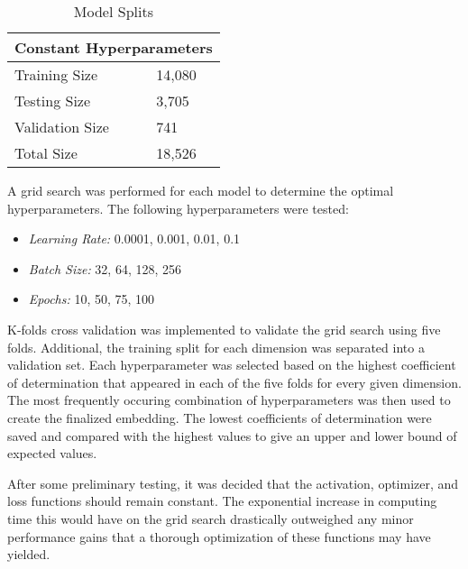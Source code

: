 \documentclass{article}
\begin{document}
\begin{table}[h!]
    \caption{Model Splits}
    \label{tab:table1}
    \vspace{0.1cm}
    \begin{tabular}{p{4cm}p{7cm}}
        \hline
        \multicolumn{2}{c}{Constant Hyperparameters}\\
        \hline
        Training Size & 14,080\\
        Testing Size & 3,705\\
        Validation Size & 741\\
        Total Size & 18,526\\
        \hline
    \end{tabular}
\end{table}
\par A grid search was performed for each model to determine the optimal hyperparameters. The following hyperparameters were tested:
\begin{itemize}
    \item \textit{Learning Rate:} 0.0001, 0.001, 0.01, 0.1
    \item \textit{Batch Size:} 32, 64, 128, 256
    \item \textit{Epochs:} 10, 50, 75, 100
\end{itemize}
\par K-folds cross validation was implemented to validate the grid search using five folds. Additional, the training split for each dimension was separated into a validation set. Each hyperparameter was selected based on the highest coefficient of determination that appeared in each of the five folds for every given dimension. The most frequently occuring combination of hyperparameters was then used to create the finalized embedding. The lowest coefficients of determination were saved and compared with the highest values to give an upper and lower bound of expected values.
\par After some preliminary testing, it was decided that the activation, optimizer, and loss functions should remain constant. The exponential increase in computing time this would have on the grid search drastically outweighed any minor performance gains that a thorough optimization of these functions may have yielded.
\end{document}
